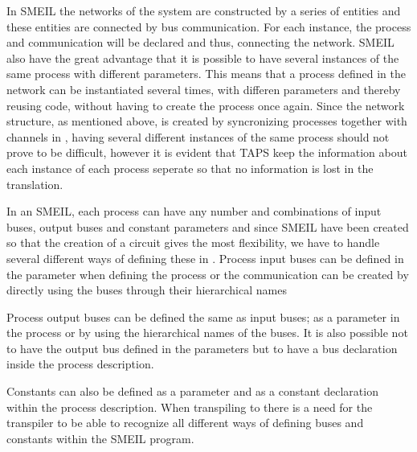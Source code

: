 In SMEIL the networks of the system are constructed by a series of entities and these entities are connected by bus communication. For each instance, the process and communication will be declared and thus, connecting the network. SMEIL also have the great advantage that it is possible to have several instances of the same process with different parameters. This means that a process defined in the network can be instantiated several times, with differen parameters and thereby reusing code, without having to create the process once again. Since the network structure, as mentioned above, is created by syncronizing processes together with channels in \cspm, having several different instances of the same process should not prove to be difficult, however it is evident that TAPS keep the information about each instance of each process seperate so that no information is lost in the translation.




In an SMEIL, each process can have any number and combinations of input buses, output buses and constant parameters and since SMEIL have been created so that the creation of a circuit gives the most flexibility, we have to handle several different ways of defining these in \cspm.
Process input buses can be defined in the parameter when defining the process or the communication can be created by directly using the buses through their hierarchical names %

Process output buses can be defined the same as input buses; as a parameter in the process or by using the hierarchical names of the buses. It is also possible not to have the output bus defined in the parameters but to have a bus declaration inside the process description.



Constants can also be defined as a parameter and as a constant declaration within the process description. %
When transpiling to \cspm there is a need for the transpiler to be able to recognize all different ways of defining buses and constants within the SMEIL program.

